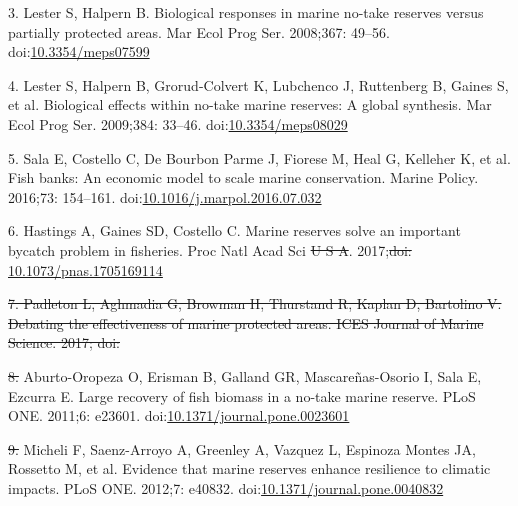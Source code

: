 \documentclass[12pt,]{article}
\providecommand{\DIFaddtex}[1]{{\protect\color{blue}\uwave{#1}}} %
\providecommand{\DIFdeltex}[1]{{\protect\color{red}\sout{#1}}}                      %
\providecommand{\DIFaddbegin}{} %
\providecommand{\DIFaddend}{} %
\providecommand{\DIFdelbegin}{} %
\providecommand{\DIFdelend}{} %
\providecommand{\DIFadd}[1]{\texorpdfstring{\DIFaddtex{#1}}{#1}} %
\providecommand{\DIFdel}[1]{\texorpdfstring{\DIFdeltex{#1}}{}} %
\newcommand{\DIFscaledelfig}{0.5}
\newlength{\DIFdelgraphicswidth} %
\newlength{\DIFdelgraphicsheight} %
\newcommand{\DIFaddincludegraphics}[2][]{{\color{blue}\fbox{\DIFOincludegraphics[#1]{#2}}}} %
\newcommand{\DIFdelincludegraphics}[2][]{%
\sbox{\DIFdelgraphicsbox}{\DIFOincludegraphics[#1]{#2}}%
\settoboxwidth{\DIFdelgraphicswidth}{\DIFdelgraphicsbox} %
\settoboxtotalheight{\DIFdelgraphicsheight}{\DIFdelgraphicsbox} %
\scalebox{\DIFscaledelfig}{%
\parbox[b]{\DIFdelgraphicswidth}{\usebox{\DIFdelgraphicsbox}\\[-\baselineskip] \rule{\DIFdelgraphicswidth}{0em}}\llap{\resizebox{\DIFdelgraphicswidth}{\DIFdelgraphicsheight}{%
\setlength{\unitlength}{\DIFdelgraphicswidth}%
\begin{picture}(1,1)%
\thicklines\linethickness{2pt} %
{\color[rgb]{1,0,0}\put(0,0){\framebox(1,1){}}}%
{\color[rgb]{1,0,0}\put(0,0){\line( 1,1){1}}}%
{\color[rgb]{1,0,0}\put(0,1){\line(1,-1){1}}}%
\end{picture}%
}\hspace*{3pt}}} %
} %
\DeclareRobustCommand{\DIFaddbegin}{\DIFOaddbegin \let\includegraphics\DIFaddincludegraphics} %
\DeclareRobustCommand{\DIFaddend}{\DIFOaddend \let\includegraphics\DIFOincludegraphics} %
\DeclareRobustCommand{\DIFdelbegin}{\DIFOdelbegin \let\includegraphics\DIFdelincludegraphics} %
\DeclareRobustCommand{\DIFdelend}{\DIFOaddend \let\includegraphics\DIFOincludegraphics} %
\begin{document}
\hypertarget{ref-lester_2008-F_}{}
3. Lester S, Halpern B. Biological responses in marine no-take reserves
versus partially protected areas. Mar Ecol Prog Ser. 2008;367: 49--56.
doi:\href{https://doi.org/10.3354/meps07599}{10.3354/meps07599}

\hypertarget{ref-lester_2009-Ks}{}
4. Lester S, Halpern B, Grorud-Colvert K, Lubchenco J, Ruttenberg B,
Gaines S, et al. Biological effects within no-take marine reserves: A
global synthesis. Mar Ecol Prog Ser. 2009;384: 33--46.
doi:\href{https://doi.org/10.3354/meps08029}{10.3354/meps08029}

\hypertarget{ref-sala_2016-PV}{}
5. Sala E, Costello C, De Bourbon Parme J, Fiorese M, Heal G, Kelleher
K, et al. Fish banks: An economic model to scale marine conservation.
Marine Policy. 2016;73: 154--161.
doi:\href{https://doi.org/10.1016/j.marpol.2016.07.032}{10.1016/j.marpol.2016.07.032}

\hypertarget{ref-hastings_2017-sm}{}
6. Hastings A, Gaines SD, Costello C. Marine reserves solve an important
bycatch problem in fisheries. Proc Natl Acad Sci \DIFdelbegin \DIFdel{U S A}\DIFdelend \DIFaddbegin \DIFadd{USA}\DIFaddend . 2017;\DIFdelbegin \DIFdel{doi:
}\DIFdelend \DIFaddbegin \DIFadd{114:
8927--8934.
doi:}\DIFaddend \href{https://doi.org/10.1073/pnas.1705169114}{10.1073/pnas.1705169114}

\DIFdelbegin %
\DIFdel{7. Padleton L, Aghmadia G, Browman H, Thurstand R, Kaplan D, Bartolino
V.
Debating the effectiveness of marine protected areas. ICES Journal of
Marine Science. 2017;
doi:}%

\DIFdelend \hypertarget{ref-aburtooropeza_2011-ya}{}
\DIFdelbegin \DIFdel{8. }\DIFdelend \DIFaddbegin \DIFadd{7. }\DIFaddend Aburto-Oropeza O, Erisman B, Galland GR, Mascareñas-Osorio I, Sala E,
Ezcurra E. Large recovery of fish biomass in a no-take marine reserve.
PLoS ONE. 2011;6: e23601.
doi:\href{https://doi.org/10.1371/journal.pone.0023601}{10.1371/journal.pone.0023601}

\hypertarget{ref-micheli_2012-EU}{}
\DIFdelbegin \DIFdel{9. }\DIFdelend \DIFaddbegin \DIFadd{8. }\DIFaddend Micheli F, Saenz-Arroyo A, Greenley A, Vazquez L, Espinoza Montes JA,
Rossetto M, et al. Evidence that marine reserves enhance resilience to
climatic impacts. PLoS ONE. 2012;7: e40832.
doi:\href{https://doi.org/10.1371/journal.pone.0040832}{10.1371/journal.pone.0040832}
\end{document}

